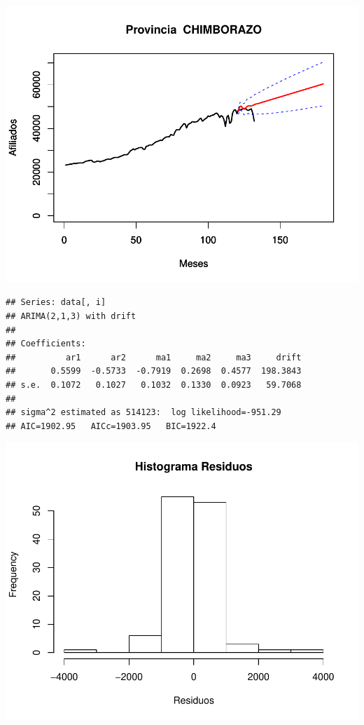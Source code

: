 \documentclass[11pt,a4paper,oneside]{article}\usepackage[]{graphicx}\usepackage[]{color}
\makeatletter
\def\maxwidth{ %
  \ifdim\Gin@nat@width>\linewidth
    \linewidth
  \else
    \Gin@nat@width
  \fi
}
\newenvironment{kframe}{%
 \def\at@end@of@kframe{}%
 \ifinner\ifhmode%
  \def\at@end@of@kframe{\end{minipage}}%
  \begin{minipage}{\columnwidth}%
 \fi\fi%
 \def\FrameCommand##1{\hskip\@totalleftmargin \hskip-\fboxsep
 \colorbox{shadecolor}{##1}\hskip-\fboxsep
     \hskip-\linewidth \hskip-\@totalleftmargin \hskip\columnwidth}%
 \MakeFramed {\advance\hsize-\width
   \@totalleftmargin\z@ \linewidth\hsize
   \@setminipage}}%
 {\par\unskip\endMakeFramed%
 \at@end@of@kframe}
\newenvironment{knitrout}{}{} %
\makeatother
\begin{document}
\begin{knitrout}
{\centering \includegraphics[width=\maxwidth]{figure/unnamed-chunk-16-13} 

}


\begin{kframe}\begin{verbatim}
## Series: data[, i] 
## ARIMA(2,1,3) with drift         
## 
## Coefficients:
##          ar1      ar2      ma1     ma2     ma3     drift
##       0.5599  -0.5733  -0.7919  0.2698  0.4577  198.3843
## s.e.  0.1072   0.1027   0.1032  0.1330  0.0923   59.7068
## 
## sigma^2 estimated as 514123:  log likelihood=-951.29
## AIC=1902.95   AICc=1903.95   BIC=1922.4
\end{verbatim}
\end{kframe}

{\centering \includegraphics[width=\maxwidth]{figure/unnamed-chunk-16-14} 

}
\end{knitrout}
\end{document}
